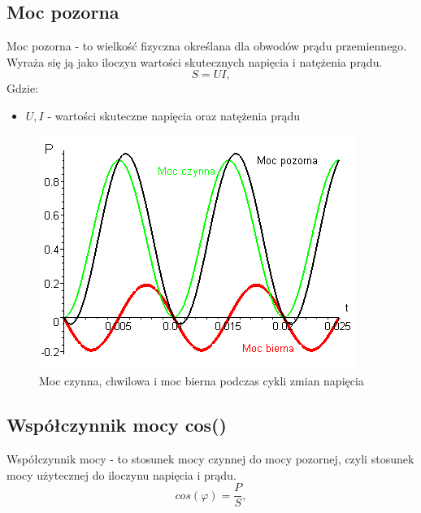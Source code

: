 \documentclass[12pt]{article}
\begin{document}
\subsection{Moc pozorna}
Moc pozorna - to wielkość fizyczna określana dla obwodów prądu przemiennego. Wyraża się ją jako iloczyn wartości skutecznych napięcia i natężenia prądu.
\begin{equation}
    S = UI,
\end{equation}
Gdzie:
\begin{itemize}
    \item $U, I$ - wartości skuteczne napięcia oraz natężenia prądu
\end{itemize}
\begin{figure}
    \centering
    \includegraphics[scale=0.5]{power_types}
    \caption{Moc czynna, chwilowa i moc bierna podczas cykli zmian napięcia}
    \label{fig:my_label}
\end{figure}
\subsection{Współczynnik mocy cos(\varphi)}
Współczynnik mocy - to stosunek mocy czynnej do mocy pozornej, czyli stosunek mocy użytecznej do iloczynu napięcia i prądu.
\begin{equation}
    cos(\varphi) = \frac{P}{S},
\end{equation}
\end{document}
